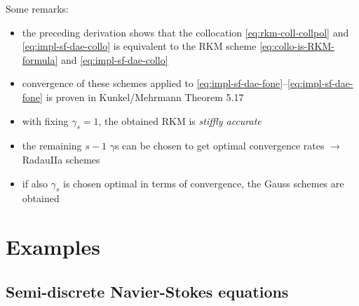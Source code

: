 \documentclass[]{book}
\providecommand{\tightlist}{%
  \setlength{\itemsep}{0pt}\setlength{\parskip}{0pt}}
\theoremstyle{definition}
\theoremstyle{definition}
\theoremstyle{definition}
\theoremstyle{definition}
\theoremstyle{remark}
\begin{document}
Some remarks:

\begin{itemize}
\tightlist
\item
  the preceding derivation shows that the collocation \eqref{eq:rkm-coll-collpol} and \eqref{eq:impl-sf-dae-collo} is equivalent to the RKM scheme \eqref{eq:collo-is-RKM-formula} and \eqref{eq:impl-sf-dae-collo}
\item
  convergence of these schemes applied to \eqref{eq:impl-sf-dae-fone}--\eqref{eq:impl-sf-dae-fone} is proven in Kunkel/Mehrmann Theorem 5.17
\item
  with fixing \(\gamma_s=1\), the obtained RKM is \emph{stiffly accurate}
\item
  the remaining \(s-1\) \(\gamma\)s can be chosen to get optimal convergence rates \(\rightarrow\) RadauIIa schemes
\item
  if also \(\gamma_s\) is chosen optimal in terms of convergence, the Gauss schemes are obtained
\end{itemize}

\hypertarget{examples-1}{%
\chapter{Examples}\label{examples-1}}

\hypertarget{semi-discrete-navier-stokes-equations}{%
\section{Semi-discrete Navier-Stokes equations}\label{semi-discrete-navier-stokes-equations}}
\end{document}
